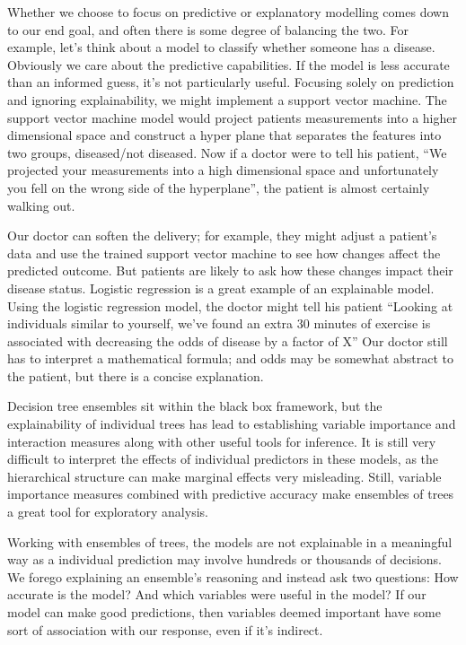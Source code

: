 \documentclass[
  12pt,
  letterpaper,
  DIV=11,
  numbers=noendperiod]{scrartcl}
\begin{document}
Whether we choose to focus on predictive or explanatory modelling comes
down to our end goal, and often there is some degree of balancing the
two. For example, let's think about a model to classify whether someone
has a disease. Obviously we care about the predictive capabilities. If
the model is less accurate than an informed guess, it's not particularly
useful. Focusing solely on prediction and ignoring explainability, we
might implement a support vector machine. The support vector machine
model would project patients measurements into a higher dimensional
space and construct a hyper plane that separates the features into two
groups, diseased/not diseased. Now if a doctor were to tell his patient,
``We projected your measurements into a high dimensional space and
unfortunately you fell on the wrong side of the hyperplane'', the
patient is almost certainly walking out.

Our doctor can soften the delivery; for example, they might adjust a
patient's data and use the trained support vector machine to see how
changes affect the predicted outcome. But patients are likely to ask how
these changes impact their disease status. Logistic regression is a
great example of an explainable model. Using the logistic regression
model, the doctor might tell his patient ``Looking at individuals
similar to yourself, we've found an extra 30 minutes of exercise is
associated with decreasing the odds of disease by a factor of X'' Our
doctor still has to interpret a mathematical formula; and odds may be
somewhat abstract to the patient, but there is a concise explanation.

Decision tree ensembles sit within the black box framework, but the
explainability of individual trees has lead to establishing variable
importance and interaction measures along with other useful tools for
inference. It is still very difficult to interpret the effects of
individual predictors in these models, as the hierarchical structure can
make marginal effects very misleading. Still, variable importance
measures combined with predictive accuracy make ensembles of trees a
great tool for exploratory analysis.

Working with ensembles of trees, the models are not explainable in a
meaningful way as a individual prediction may involve hundreds or
thousands of decisions. We forego explaining an ensemble's reasoning and
instead ask two questions: How accurate is the model? And which
variables were useful in the model? If our model can make good
predictions, then variables deemed important have some sort of
association with our response, even if it's indirect.
\end{document}
